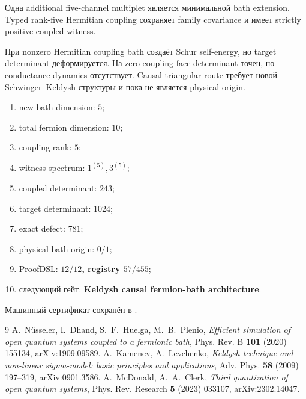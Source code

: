 \begin{theorem}
Одна additional five-channel multiplet является минимальной bath extension.
Typed rank-five Hermitian coupling сохраняет family covariance и имеет
strictly positive coupled witness.
\end{theorem}

\begin{nogocriterion}
При nonzero Hermitian coupling bath создаёт Schur self-energy, но target
determinant деформируется. На zero-coupling face determinant точен, но
conductance dynamics отсутствует. Causal triangular route требует новой
Schwinger--Keldysh структуры и пока не является physical origin.
\end{nogocriterion}

\begin{protocol}\begin{enumerate}
\item new bath dimension: \textbf{$5$};
\item total fermion dimension: \textbf{$10$};
\item coupling rank: \textbf{$5$};
\item witness spectrum: \textbf{$1^{(5)},3^{(5)}$};
\item coupled determinant: \textbf{$243$};
\item target determinant: \textbf{$1024$};
\item exact defect: \textbf{$781$};
\item physical bath origin: \textbf{$0/1$};
\item ProofDSL: \textbf{$12/12$, registry $57/455$};
\item следующий гейт: \textbf{Keldysh causal fermion-bath architecture}.
\end{enumerate}\end{protocol}

Машинный сертификат сохранён в
.

\begin{thebibliography}{9}
A.~N\"usseler, I.~Dhand, S.~F.~Huelga, M.~B.~Plenio,
\emph{Efficient simulation of open quantum systems coupled to a fermionic
bath}, Phys. Rev. B \textbf{101} (2020) 155134, arXiv:1909.09589.
A.~Kamenev, A.~Levchenko,
\emph{Keldysh technique and non-linear sigma-model: basic principles and
applications}, Adv. Phys. \textbf{58} (2009) 197--319,
arXiv:0901.3586.
A.~McDonald, A.~A.~Clerk,
\emph{Third quantization of open quantum systems},
Phys. Rev. Research \textbf{5} (2023) 033107, arXiv:2302.14047.
\end{thebibliography}